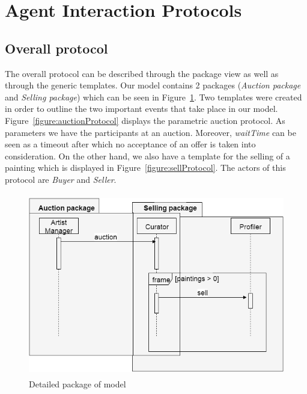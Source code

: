 \documentclass[a4paper,11pt]{report}
\begin{document}
  
  
  
  
  \section{Agent Interaction Protocols} %
  
  
  \subsection{Overall protocol} %
  The overall protocol can be described through the package view as well as
  through the generic templates. Our model contains 2 packages (\textit{Auction package}
  and \textit{Selling package}) which can be seen in Figure~\ref{figure:package}.
  Two templates were created in order to outline the two important events that take
  place in our model. Figure~\ref{figure:auctionProtocol} displays the parametric auction protocol.
  As parameters we have the participants at an auction. Moreover, \textit{waitTime} can be seen
  as a timeout after which no acceptance of an offer is taken into consideration. On the 
  other hand, we also have a template for the selling of a painting which
  is displayed in Figure~\ref{figure:sellProtocol}. The actors of this protocol are \textit{Buyer}
  and \textit{Seller}.
  
   \begin{figure}[ht!]
    \centering
    \includegraphics[height=8cm]{media/package.png}
    \caption{Detailed package of model}
    \label{figure:package}
   \end{figure}
\end{document}
